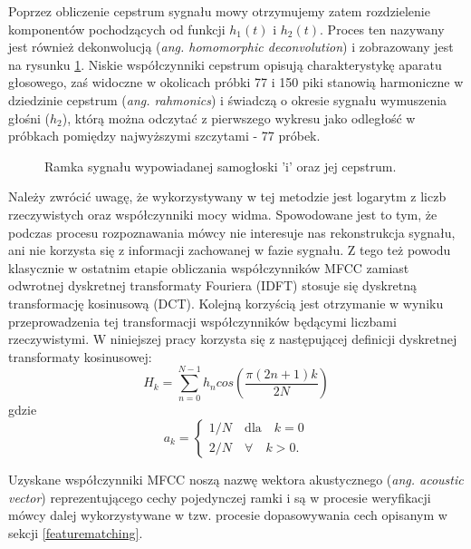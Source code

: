 Poprzez obliczenie cepstrum sygnału mowy otrzymujemy zatem rozdzielenie komponentów pochodzących od funkcji $h_1(t)$ i $h_2(t)$. Proces ten nazywany jest również dekonwolucją (\textit{ang. homomorphic deconvolution}) \cite{hdsp} i  zobrazowany jest na rysunku \ref{fig:e_cepstrum}. Niskie współczynniki cepstrum opisują charakterystykę aparatu głosowego, zaś widoczne w okolicach próbki 77 i 150 piki stanowią harmoniczne w dziedzinie cepstrum (\textit{ang. rahmonics}) i świadczą o okresie sygnału wymuszenia głośni ($h_2$), którą można odczytać z pierwszego wykresu jako odległość w próbkach pomiędzy najwyższymi szczytami - 77 próbek.

\begin{figure}
  \centering
  \begin{minipage}{.5\textwidth}
    \centering
    
  \end{minipage}%
  \begin{minipage}{.5\textwidth}
    \centering
    
  \end{minipage}
  \caption{Ramka sygnału wypowiadanej samogłoski 'i' oraz jej cepstrum.}
  \label{fig:e_cepstrum}
\end{figure}

Należy zwrócić uwagę, że wykorzystywany w tej metodzie jest logarytm z liczb rzeczywistych oraz współczynniki mocy widma. Spowodowane jest to tym, że podczas procesu rozpoznawania mówcy nie interesuje nas rekonstrukcja sygnału, ani nie korzysta się z informacji zachowanej w fazie sygnału. Z tego też powodu klasycznie w ostatnim etapie obliczania współczynników MFCC zamiast odwrotnej dyskretnej transformaty Fouriera (IDFT) stosuje się dyskretną transformację kosinusową (DCT). Kolejną korzyścią jest otrzymanie w wyniku przeprowadzenia tej transformacji współczynników będącymi liczbami rzeczywistymi. W niniejszej pracy korzysta się z następującej definicji dyskretnej transformaty kosinusowej:
\begin{equation}
  \label{dct}
    H_k = \sum_{n=0}^{N-1} h_ncos\left(\frac{\pi (2n+1)k}{2N}\right)
\end{equation}
gdzie
\begin{equation}
    a_k = 
    \begin{cases}
        1/N \quad \text{dla}\quad k=0 \\
        2/N \quad \forall \quad k>0.
    \end{cases}
\end{equation}

Uzyskane współczynniki MFCC noszą nazwę wektora akustycznego (\textit{ang. acoustic vector}) reprezentującego cechy pojedynczej ramki i są w procesie weryfikacji mówcy dalej wykorzystywane w tzw. procesie dopasowywania cech opisanym w sekcji \ref{featurematching}.

